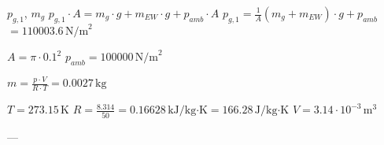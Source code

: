 \( p_{g,1} \), \( m_g \)  
\( p_{g,1} \cdot A = m_g \cdot g + m_{EW} \cdot g + p_{amb} \cdot A \)  
\( p_{g,1} = \frac{1}{A} (m_g + m_{EW}) \cdot g + p_{amb} \)  
\( = 110003.6 \, \text{N/m}^2 \)  

\( A = \pi \cdot 0.1^2 \)  
\( p_{amb} = 100000 \, \text{N/m}^2 \)  

\( m = \frac{p \cdot V}{R \cdot T} = 0.0027 \, \text{kg} \)  

\( T = 273.15 \, \text{K} \)  
\( R = \frac{8.314}{50} = 0.16628 \, \text{kJ/kg·K} = 166.28 \, \text{J/kg·K} \)  
\( V = 3.14 \cdot 10^{-3} \, \text{m}^3 \)  

---